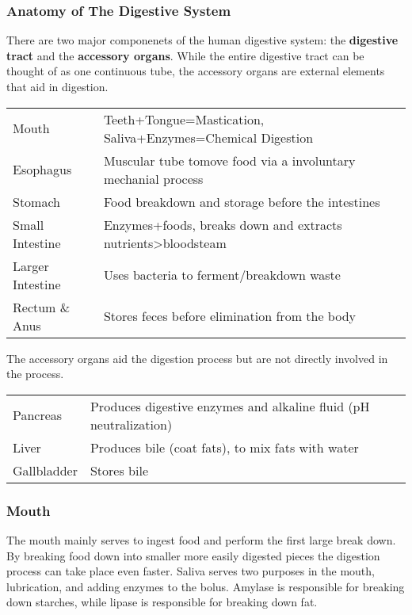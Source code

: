 \documentclass[letterpaper, 11pt]{article}
\begin{document}
\subsubsection{Anatomy of The Digestive System}
\label{sec:orgea4c6c7}
There are two major componenets of the human digestive system: the \textbf{digestive tract} and the \textbf{accessory organs}. While the entire digestive tract can be thought of as one continuous tube, the accessory organs are external elements that aid in digestion.\\
\begin{center}
\begin{tabular}{ll}
Mouth & Teeth+Tongue=Mastication, Saliva+Enzymes=Chemical Digestion\\
Esophagus & Muscular tube tomove food via a involuntary mechanial process\\
Stomach & Food breakdown and storage before the intestines\\
Small Intestine & Enzymes+foods, breaks down and extracts nutrients>bloodsteam\\
Larger Intestine & Uses bacteria to ferment/breakdown waste\\
Rectum \& Anus & Stores feces before elimination from the body\\
\end{tabular}
\end{center}
The accessory organs aid the digestion process but are not directly involved in the process.\\
\begin{center}
\begin{tabular}{ll}
Pancreas & Produces digestive enzymes and alkaline fluid (pH neutralization)\\
Liver & Produces bile (coat fats), to mix fats with water\\
Gallbladder & Stores bile\\
\end{tabular}
\end{center}
\subsubsection{Mouth}
\label{sec:orge3ccb5f}
The mouth mainly serves to ingest food and perform the first large break down. By breaking food down into smaller more easily digested pieces the digestion process can take place even faster. Saliva serves two purposes in the mouth, lubrication, and adding enzymes to the bolus. Amylase is responsible for breaking down starches, while lipase is responsible for breaking down fat.\\
\end{document}
